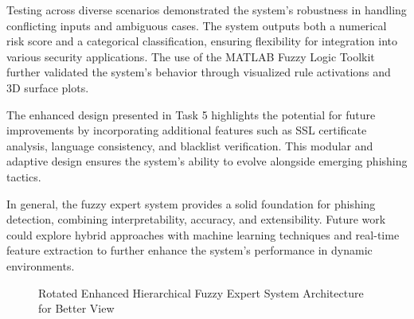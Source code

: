 \documentclass{article}
\begin{document}
Testing across diverse scenarios demonstrated the system's robustness in handling conflicting inputs and ambiguous cases. The system outputs both a numerical risk score and a categorical classification, ensuring flexibility for integration into various security applications. The use of the MATLAB Fuzzy Logic Toolkit further validated the system's behavior through visualized rule activations and 3D surface plots.

The enhanced design presented in Task 5 highlights the potential for future improvements by incorporating additional features such as SSL certificate analysis, language consistency, and blacklist verification. This modular and adaptive design ensures the system's ability to evolve alongside emerging phishing tactics.

In general, the fuzzy expert system provides a solid foundation for phishing detection, combining interpretability, accuracy, and extensibility. Future work could explore hybrid approaches with machine learning techniques and real-time feature extraction to further enhance the system's performance in dynamic environments.

\newpage
\printbibliography

\newpage

\begin{figure}[t]
    \centering
    \caption{Rotated Enhanced Hierarchical Fuzzy Expert System Architecture for Better View}
    \label{fig:rotated_architecture}
\end{figure}
\vfill
\end{document}
